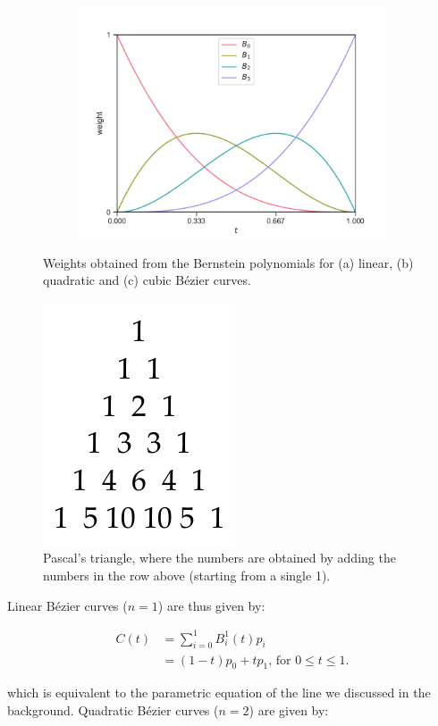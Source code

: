 \begin{figure}
\begin{subfigure}{0.5\linewidth}
\includegraphics[width=\linewidth]{figs/bernstein3}
\caption{}%
\label{subfig:bernstein3}
\end{subfigure}%
\caption{Weights obtained from the Bernstein polynomials for (a) linear, (b) quadratic and (c) cubic B\'ezier curves.}%
\label{fig:bernstein}
\end{figure}

\begin{figure}
\centering
\includegraphics[width=0.2\linewidth]{figs/pascal-triangle}
\caption{Pascal's triangle, where the numbers are obtained by adding the numbers in the row above (starting from a single 1).}%
\label{fig:pascal}
\end{figure}

Linear B\'ezier curves (\(n = 1\)) are thus given by:

\begin{align}
\label{eq:bezier1}
C(t) &= \sum_{i=0}^1 B^1_i(t) p_i \nonumber \\
&= (1-t) p_0 + t p_1\text{, for }0 \leq t \leq 1.
\end{align}

which is equivalent to the parametric equation of the line we discussed in the background.
Quadratic B\'ezier curves (\(n = 2\)) are given by:


